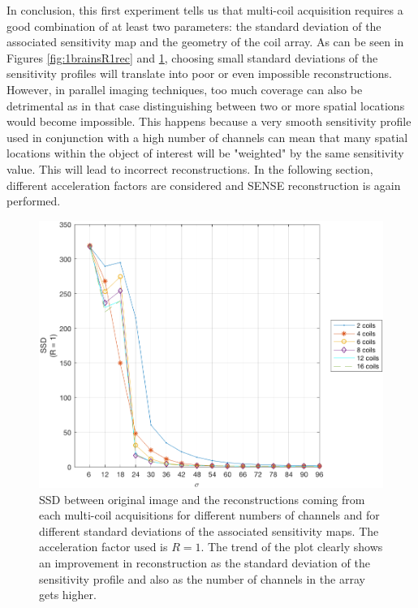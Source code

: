 In conclusion, this first experiment tells us that multi-coil acquisition requires a good combination of at least two parameters: the standard deviation of the associated sensitivity map and the geometry of the coil array. As can be seen in Figures \ref{fig:1brainsR1rec} and \ref{fig:1brainsR1ssd}, choosing small standard deviations of the sensitivity profiles will translate into poor or even impossible reconstructions. However, in parallel imaging techniques, too much coverage can also be detrimental as in that case distinguishing between two or more spatial locations would become impossible. This happens because a very smooth sensitivity profile used in conjunction with a high number of channels can mean that many spatial locations within the object of interest will be "weighted" by the same sensitivity value. This will lead to incorrect reconstructions. In the following section, different acceleration factors are considered and SENSE reconstruction is again performed.

\begin{figure}[H]
    \centering
    \includegraphics[width=1\textwidth,keepaspectratio]{1brainR1ssd}
    \caption{SSD between original image and the reconstructions coming from each multi-coil acquisitions for different numbers of channels and for different standard deviations of the associated sensitivity maps. The acceleration factor used is $R = 1$. The trend of the plot clearly shows an improvement in reconstruction as the standard deviation of the sensitivity profile and also as the number of channels in the array gets higher.}
    \label{fig:1brainsR1ssd}
\end{figure}

